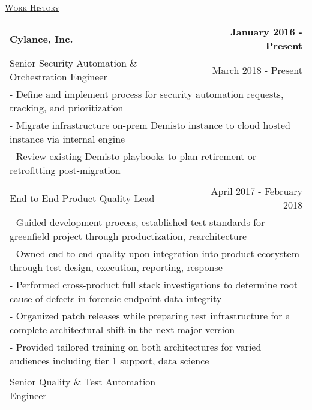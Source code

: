 \documentclass[letterpaper]{article}
\begin{document}
	\begin{center}
		\vspace{0.25in} \\
		\underline{\large \scshape Work History}
		\begin{tabular}{p{}p{}r}
				\textbf{Cylance, Inc.} & &
				\textbf{January 2016 - Present\quad}
			\\		%
				\multicolumn{2}{p{0.5\textwidth}}{\quad Senior Security Automation \& Orchestration Engineer}
				&
				{March 2018 - Present \quad\quad\quad\quad}
			\\
				\multicolumn{3}{p{\textwidth}}{\quad\quad - Define and implement process for security automation requests, tracking, and prioritization}
			\\
				\multicolumn{3}{p{\textwidth}}{\quad\quad - Migrate infrastructure on-prem Demisto instance to cloud hosted instance via internal engine} 
			\\
				\multicolumn{3}{p{\textwidth}}{\quad\quad - Review existing Demisto playbooks to plan retirement or retrofitting post-migration}
			\\
			\\		%
				\multicolumn{2}{p{0.5\textwidth}}{\quad End-to-End Product Quality Lead}
				&
				{April 2017 - February 2018 \quad\quad\quad\quad}
			\\
				\multicolumn{3}{p{\textwidth}}{\quad\quad - Guided development process, established test standards for greenfield project through productization, rearchitecture} 
			\\
				\multicolumn{3}{p{\textwidth}}{\quad\quad - Owned end-to-end quality upon integration into product ecosystem through test design, execution, reporting, response} 
			\\
				\multicolumn{3}{p{\textwidth}}{\quad\quad - Performed cross-product full stack investigations to determine root cause of defects in forensic endpoint data integrity} 
			\\
				\multicolumn{3}{p{\textwidth}}{\quad\quad - Organized patch releases while preparing test infrastructure for a complete architectural shift in the next major version} 
			\\
				\multicolumn{3}{p{\textwidth}}{\quad\quad - Provided tailored training on both architectures for varied audiences including tier 1 support, data science}
			\\
			\\
				\multicolumn{2}{p{0.5\textwidth}}{\quad Senior Quality \& Test Automation Engineer}

\end{tabular}
\end{center}
\end{document}
